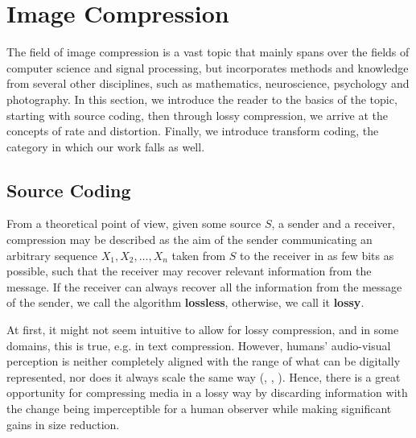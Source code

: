 \section{Image Compression}
\label{sec:intro_image_compression}
\par
The field of image compression is a vast topic that mainly spans over the fields
of computer science and signal processing, but incorporates methods and
knowledge from several
other disciplines, such as mathematics, neuroscience, psychology
and photography. In this section, we introduce the reader to the basics of the
topic, starting with source coding, then through lossy compression, we arrive at
the concepts of rate and distortion. Finally, we introduce transform coding, the
category in which our work falls as well.

\subsection{Source Coding}
From a theoretical point of view, given some source $S$, a sender and a
receiver, compression may be described as the aim of the sender communicating an
arbitrary sequence $X_1, X_2, \hdots, X_n$ taken from $S$ to the receiver in as few bits
as possible, such that the receiver may recover relevant information from the message.
If the receiver can always recover all the information from the message of the sender, we
call the algorithm \textbf{lossless}, otherwise, we call it \textbf{lossy}. 
\par
At first, it might not seem intuitive to allow for lossy compression, and in some
domains, this is true, e.g. in text compression. However, 
humans' audio-visual perception is neither completely aligned with the range of
what can be digitally represented, nor does it always scale the same way
(\cite{eskicioglu1994image}, \cite{psnr}, \cite{gupta2011modified}). Hence,
there is a great opportunity for compressing media in a lossy way by discarding
information with the change being imperceptible for a human observer while
making significant gains in size reduction.
